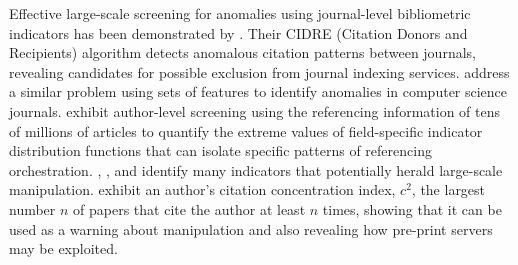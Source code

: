 \documentclass[10pt]{article}
\begin{document}
Effective large-scale screening for anomalies using journal-level bibliometric indicators has been demonstrated by \cite{kojakuDetectingAnomalousCitation2021}. Their CIDRE (Citation Donors and Recipients) algorithm detects anomalous citation patterns between journals, revealing candidates for possible exclusion from journal indexing services. \cite{chakrabortyIdentificationAnalysisCitation2020} address a similar problem using sets of features to identify anomalies in computer science journals. \cite{evdaimonMetricsDetectSmallScale2024} exhibit author-level screening using the referencing information of tens of millions of articles to quantify the extreme values of field-specific indicator distribution functions that can isolate specific patterns of referencing orchestration. \cite{ioannidisFeaturesSignalsPrecocious2024a},  \cite{ioannidisEvolvingPatternsExtreme2024a}, and \cite{ioannidisQuantitativeResearchAssessment2023a} identify many indicators that potentially herald large-scale manipulation. \cite{ibrahimCitationManipulationCitation2025} exhibit an author's citation concentration index, $c^2$, the largest number $n$ of papers that cite the author at least $n$ times, showing that it can be used as a warning about manipulation and also revealing how pre-print servers may be exploited.
\end{document}

